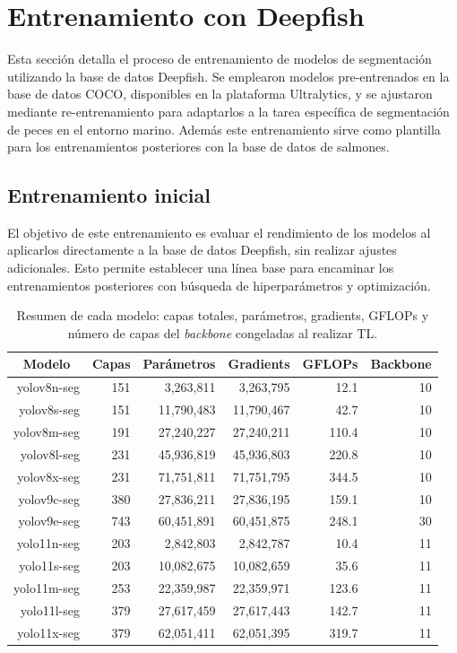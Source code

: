 \section{Entrenamiento con Deepfish}
Esta sección detalla el proceso de entrenamiento de modelos de segmentación utilizando la base de datos Deepfish. Se emplearon modelos pre-entrenados en la base de datos COCO, disponibles en la plataforma Ultralytics, y se ajustaron mediante re-entrenamiento para adaptarlos a la tarea específica de segmentación de peces en el entorno marino. Además este entrenamiento sirve como plantilla para los entrenamientos posteriores con la base de datos de salmones.

\subsection{Entrenamiento inicial}
\label{sec:entrenamientoDeepfish}
El objetivo de este entrenamiento es evaluar el rendimiento de los modelos al aplicarlos directamente a la base de datos Deepfish, sin realizar ajustes adicionales. Esto permite establecer una línea base para encaminar los entrenamientos posteriores con búsqueda de hiperparámetros y optimización.

\begin{table}[htbp]
\centering
\caption[Sumario de modelos YOLO a entrenar]{Resumen de cada modelo: capas totales, parámetros, gradients, GFLOPs y número de capas del \textit{backbone} congeladas al realizar TL.}
\label{tab:models_summary_freeze}
\begin{tabular}{|r|r|r|r|r|r|}
\hline
\multicolumn{1}{|c|}{\textbf{Modelo}} & \multicolumn{1}{c|}{\textbf{Capas}} & \multicolumn{1}{c|}{\textbf{Parámetros}} & \multicolumn{1}{c|}{\textbf{Gradients}} & \multicolumn{1}{c|}{\textbf{GFLOPs}} & \multicolumn{1}{c|}{\textbf{Backbone}} \\ \hline
yolov8n-seg & 151 & 3,263,811 & 3,263,795 & 12.1 & 10 \\ \hline
yolov8s-seg & 151 & 11,790,483 & 11,790,467 & 42.7 & 10 \\ \hline
yolov8m-seg & 191 & 27,240,227 & 27,240,211 & 110.4 & 10 \\ \hline
yolov8l-seg & 231 & 45,936,819 & 45,936,803 & 220.8 & 10 \\ \hline
yolov8x-seg & 231 & 71,751,811 & 71,751,795 & 344.5 & 10 \\ \hline
yolov9c-seg & 380 & 27,836,211 & 27,836,195 & 159.1 & 10 \\ \hline
yolov9e-seg & 743 & 60,451,891 & 60,451,875 & 248.1 & 30 \\ \hline
yolo11n-seg & 203 & 2,842,803 & 2,842,787 & 10.4 & 11 \\ \hline
yolo11s-seg & 203 & 10,082,675 & 10,082,659 & 35.6 & 11 \\ \hline
yolo11m-seg & 253 & 22,359,987 & 22,359,971 & 123.6 & 11 \\ \hline
yolo11l-seg & 379 & 27,617,459 & 27,617,443 & 142.7 & 11 \\ \hline
yolo11x-seg & 379 & 62,051,411 & 62,051,395 & 319.7 & 11 \\ \hline
\end{tabular}
\end{table}

